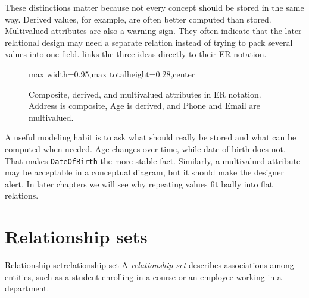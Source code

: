 \documentclass[11pt,a4paper,openany]{book}
\begin{document}
These distinctions matter because not every concept should be stored in the same way. Derived values, for example, are often better computed than stored. Multivalued attributes are also a warning sign. They often indicate that the later relational design may need a separate relation instead of trying to pack several values into one field.  links the three ideas directly to their ER notation.

\begin{figure}[tbp]
\centering
\begin{adjustbox}{max width=0.95\linewidth,max totalheight=0.28\textheight,center}
\end{adjustbox}
\caption{Composite, derived, and multivalued attributes in ER notation. Address is composite, Age is derived, and Phone and Email are multivalued.}
\label{fig:er-attribute-types}
\end{figure}

A useful modeling habit is to ask what should really be stored and what can be computed when needed. Age changes over time, while date of birth does not. That makes \texttt{DateOfBirth} the more stable fact. Similarly, a multivalued attribute may be acceptable in a conceptual diagram, but it should make the designer alert. In later chapters we will see why repeating values fit badly into flat relations.

\section{Relationship sets}
\begin{definition}{Relationship set}{relationship-set}
A \emph{relationship set} describes associations among entities, such as a student enrolling in a course or an employee working in a department.
\end{definition}
\end{document}
